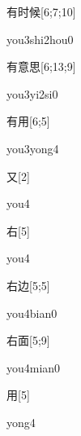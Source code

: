\begin{verbete}{有时候}[6;7;10]
\begin{pronuncia}{you3shi2hou0}
\end{pronuncia}
\end{verbete}

\begin{verbete}[you3yi2si0]{有意思}[6;13;9]
\begin{pronuncia}{you3yi2si0}
\end{pronuncia}
\end{verbete}

\begin{verbete}{有用}[6;5]
\begin{pronuncia}{you3yong4}
\end{pronuncia}
\end{verbete}

\begin{verbete}[you4]{又}[2]
\begin{pronuncia}{you4}
\end{pronuncia}
\end{verbete}

\begin{verbete}[you4]{右}[5]
\begin{pronuncia}{you4}
\end{pronuncia}
\end{verbete}

\begin{verbete}{右边}[5;5]
\begin{pronuncia}{you4bian0}
\end{pronuncia}
\end{verbete}

\begin{verbete}{右面}[5;9]
\begin{pronuncia}{you4mian0}
\end{pronuncia}
\end{verbete}

\begin{verbete}[yong4]{用}[5]
\begin{pronuncia}{yong4}
\end{pronuncia}
\end{verbete}

